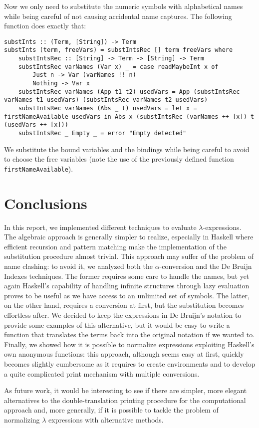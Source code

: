 \documentclass{article}
\begin{document}
Now we only need to substitute the numeric symbols with alphabetical names while being careful of not causing accidental name captures. The following function does exactly that:

\begin{lstlisting}
substInts :: (Term, [String]) -> Term
substInts (term, freeVars) = substIntsRec [] term freeVars where
    substIntsRec :: [String] -> Term -> [String] -> Term
    substIntsRec varNames (Var x) _ = case readMaybeInt x of
        Just n -> Var (varNames !! n)
        Nothing -> Var x
    substIntsRec varNames (App t1 t2) usedVars = App (substIntsRec varNames t1 usedVars) (substIntsRec varNames t2 usedVars)
    substIntsRec varNames (Abs _ t) usedVars = let x = firstNameAvailable usedVars in Abs x (substIntsRec (varNames ++ [x]) t (usedVars ++ [x]))
    substIntsRec _ Empty _ = error "Empty detected"
\end{lstlisting}

We substitute the bound variables and the bindings while being careful to avoid to choose the free variables (note the use of the previously defined function \lstinline|firstNameAvailable|).

\section{Conclusions}\label{sec:conclusions}

In this report, we implemented different techniques to evaluate $\lambda$-expressions. The algebraic approach is generally simpler to realize, especially in Haskell where efficient recursion and pattern matching make the implementation of the substitution procedure almost trivial. This approach may suffer of the problem of name clashing: to avoid it, we analyzed both the $\alpha$-conversion and the De Bruijn Indexes techniques. The former requires some care to handle the names, but yet again Haskell's capability of handling infinite structures through lazy evaluation proves to be useful as we have access to an unlimited set of symbols. The latter, on the other hand, requires a conversion at first, but the substitution becomes effortless after. We decided to keep the expressions in De Bruijn's notation to provide some examples of this alternative, but it would be easy to write a function that translates the terms back into the original notation if we wanted to. Finally, we showed how it is possible to normalize expressions exploiting Haskell's own anonymous functions: this approach, although seems easy at first, quickly becomes slightly cumbersome as it requires to create environments and to develop a quite complicated print mechanism with multiple conversions.

As future work, it would be interesting to see if there are simpler, more elegant alternatives to the double-translation printing procedure for the computational approach and, more generally, if it is possible to tackle the problem of normalizing $\lambda$ expressions with alternative methods.



\clearpage
\end{document}
